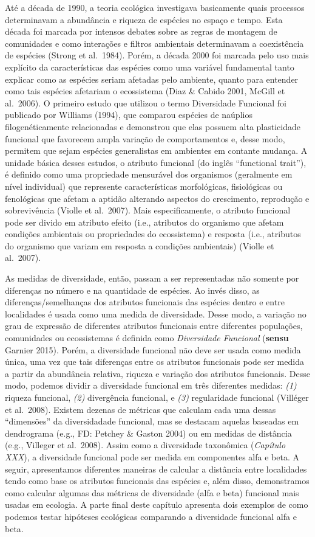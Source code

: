 \documentclass[
]{book}
\begin{document}
Até a década de 1990, a teoria ecológica investigava basicamente quais processos determinavam a abundância e riqueza de espécies no espaço e tempo. Esta década foi marcada por intensos debates sobre as regras de montagem de comunidades e como interações e filtros ambientais determinavam a coexistência de espécies (Strong et al.~1984). Porém, a década 2000 foi marcada pelo uso mais explícito da características das espécies como uma variável fundamental tanto explicar como as espécies seriam afetadas pelo ambiente, quanto para entender como tais espécies afetariam o ecossistema (Diaz \& Cabido 2001, McGill et al.~2006). O primeiro estudo que utilizou o termo Diversidade Funcional foi publicado por Williams (1994), que comparou espécies de naúplios filogenéticamente relacionadas e demonstrou que elas possuem alta plasticidade funcional que favorecem ampla variação de comportamentos e, desse modo, permitem que sejam espécies generalistas em ambientes em contante mudança.
A unidade básica desses estudos, o atributo funcional (do inglês ``functional trait''), é definido como uma propriedade mensurável dos organismos (geralmente em nível individual) que represente características morfológicas, fisiológicas ou fenológicas que afetam a aptidão alterando aspectos do crescimento, reprodução e sobrevivência (Violle et al.~2007). Mais especificamente, o atributo funcional pode ser divido em atributo efeito (i.e., atributos do organismo que afetam condições ambientais ou propriedades do ecossistema) e resposta (i.e., atributos do organismo que variam em resposta a condições ambientais) (Violle et al.~2007).

As medidas de diversidade, então, passam a ser representadas não somente por diferenças no número e na quantidade de espécies. Ao invés disso, as diferenças/semelhanças dos atributos funcionais das espécies dentro e entre localidades é usada como uma medida de diversidade. Desse modo, a variação no grau de expressão de diferentes atributos funcionais entre diferentes populações, comunidades ou ecossistemas é definida como \emph{Diversidade Funcional} (\textbf{sensu} Garnier 2015). Porém, a diversidade funcional não deve ser usada como medida única, uma vez que tais diferenças entre os atributos funcionais pode ser medida a partir da abundância relativa, riqueza e variação dos atributos funcionais. Desse modo, podemos dividir a diversidade funcional em três diferentes medidas: \emph{(1)} riqueza funcional, \emph{(2)} divergência funcional, e \emph{(3)} regularidade funcional (Villéger et al.~2008). Existem dezenas de métricas que calculam cada uma dessas ``dimensões'' da diversidadade funcional, mas se destacam aquelas baseadas em dendrograma (e.g., FD: Petchey \& Gaston 2004) ou em medidas de distância (e.g., Villeger et al.~2008). Assim como a diversidade taxonômica (\emph{Capítulo XXX}), a diversidade funcional pode ser medida em componentes alfa e beta. A seguir, apresentamos diferentes maneiras de calcular a distância entre localidades tendo como base os atributos funcionais das espécies e, além disso, demonstramos como calcular algumas das métricas de diversidade (alfa e beta) funcional mais usadas em ecologia. A parte final deste capítulo apresenta dois exemplos de como podemos testar hipóteses ecológicas comparando a diversidade funcional alfa e beta.
\end{document}
